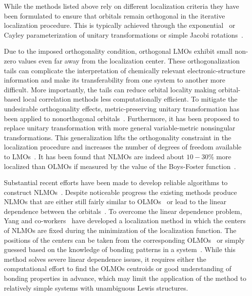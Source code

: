 \documentclass[aps,prl,reprint,amsmath,amssymb]{revtex4-1}
\begin{document}
While the methods listed above rely on different localization criteria they have been formulated to ensure that orbitals remain orthogonal in the iterative localization procedure. This is typically achieved through the exponential~\cite{berghold2000general} or Cayley parameterization of unitary transformations or simple Jacobi rotations~\cite{edmiston1963localized}.

Due to the imposed orthogonality condition, orthogonal LMOs exhibit small non-zero values even far away from the localization center. 
These orthogonalization tails can complicate the interpretation of chemically relevant electronic-structure information and make its transferability from one system to another more difficult. 
More importantly, the tails can reduce orbital locality making orbital-based local correlation methods less computationally efficient.
To mitigate the undesirable orthogonality effects, metric-preserving unitary transformation has been applied to nonorthogonal orbitals~\cite{hoyvik2017generalising}. 
Furthermore, it has been proposed to replace unitary transformation with more general variable-metric nonsingular transformations. 
This generalization lifts the orthogonality constraint in the localization procedure and increases the number of degrees of freedom available to LMOs~\cite{anderson1968self, diner1968fully, magnasco1974localized, payne1977hartree, mehler1977self, feng2004An_efficient, cui2010efficient}. 
It has been found that NLMOs are indeed about $10-30 \%$ more localized than OLMOs if measured by the value of the Boys-Foster function~\cite{feng2004An_efficient, liu2000nonorthogonal}. 

Substantial recent efforts have been made to develop reliable algorithms to construct NLMOs~\cite{feng2004An_efficient, liu2000nonorthogonal, peng2013effective, hoyvik2017generalising}. 
Despite noticeable progress the existing methods produce NLMOs that are either still fairly similar to OLMOs~\cite{sundberg1979variationally} or lead to the linear dependence between the orbitals~\cite{feng2004An_efficient}. 
To overcome the linear dependence problem, Yang and co-workers~\cite{feng2004An_efficient, cui2010efficient} have developed a localization method in which the centers of NLMOs are fixed during the minimization of the localization function. 
The positions of the centers can be taken from the corresponding OLMOs~\cite{feng2004An_efficient} or simply guessed based on the knowledge of bonding patterns in a system~\cite{cui2010efficient}. %
While this method solves severe linear dependence issues, it requires either the computational effort to find the OLMOs centroids or good understanding of bonding properties in advance, which may limit the application of the method to relatively simple systems with unambiguous Lewis structures.
\end{document}
